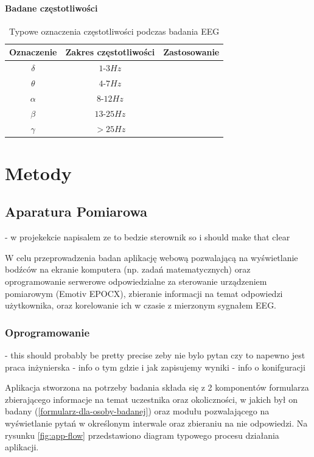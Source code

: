 \documentclass{./assets/wfis}
\begin{document}
\subsubsection{Badane częstotliwości}

\begin{table}[h]
    \centering
    \begin{tabular}{|c|c|c|}
        \hline
        Oznaczenie & Zakres częstotliwości & Zastosowanie \\
        \hline
        $\delta$ & $1$-$3Hz$ & \\
        $\theta$ & $4$-$7Hz$ & \\
        $\alpha$ & $8$-$12Hz$ & \\
        $\beta$  & $13$-$25Hz$ & \\
        $\gamma$ & $>25Hz$ & \\
        \hline
    \end{tabular}
    \caption{Typowe oznaczenia częstotliwości podczas badania EEG}
    \label{tab:freqs}
\end{table}
\chapter{Metody}

\section{Aparatura Pomiarowa}\label{aparatura-pomiarowa}

- w projekekcie napisalem ze to bedzie sterownik so i should make that clear

W celu przeprowadzenia badan aplikację webową pozwalającą na wyświetlanie bodźców na ekranie komputera (np. zadań matematycznych) oraz oprogramowanie serwerowe odpowiedzialne za sterowanie urządzeniem pomiarowym (Emotiv EPOCX), zbieranie informacji na temat odpowiedzi użytkownika, oraz korelowanie ich w czasie z mierzonym sygnałem EEG.

\subsection{Oprogramowanie}
- this should probably be pretty precise zeby nie bylo pytan czy to napewno jest praca inżynierska
- info o tym gdzie i jak zapisujemy wyniki
- info o konifguracji
 
Aplikacja stworzona na potrzeby badania składa się z 2 komponentów formularza zbierającego informacje na temat uczestnika oraz okoliczności, w jakich był on badany (\autoref{formularz-dla-osoby-badanej}) oraz modułu pozwalającego na wyświetlanie pytań w określonym interwale oraz zbieraniu na nie odpowiedzi. Na rysunku \ref{fig:app-flow} przedstawiono diagram typowego procesu działania aplikacji.
\end{document}
